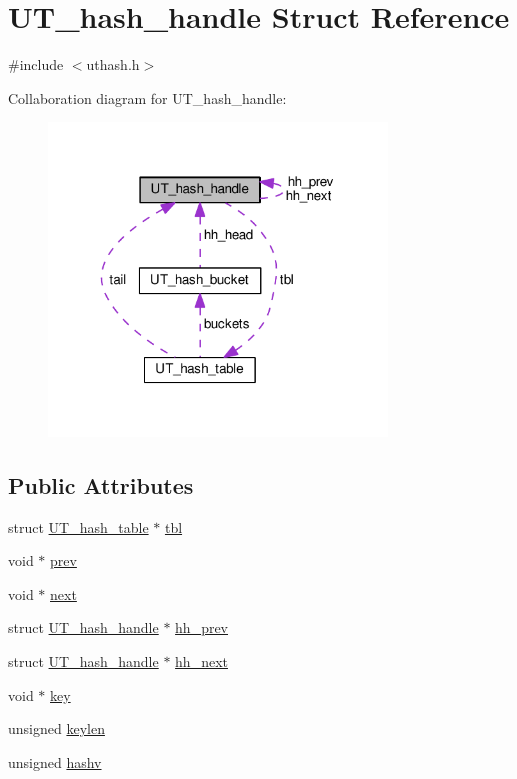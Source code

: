 \hypertarget{struct_u_t__hash__handle}{}\section{U\+T\+\_\+hash\+\_\+handle Struct Reference}
\label{struct_u_t__hash__handle}


{\ttfamily \#include $<$uthash.\+h$>$}



Collaboration diagram for U\+T\+\_\+hash\+\_\+handle\+:
\nopagebreak
\begin{figure}[H]
\begin{center}
\leavevmode
\includegraphics[width=255pt]{struct_u_t__hash__handle__coll__graph}
\end{center}
\end{figure}
\subsection*{Public Attributes}
\begin{DoxyCompactItemize}
\item 
struct \hyperlink{struct_u_t__hash__table}{U\+T\+\_\+hash\+\_\+table} $\ast$ \hyperlink{struct_u_t__hash__handle_ad2035ee3b2aa55b22e352341372a5e73}{tbl}
\item 
void $\ast$ \hyperlink{struct_u_t__hash__handle_abaf54a69367933df2d45575f48ca6a58}{prev}
\item 
void $\ast$ \hyperlink{struct_u_t__hash__handle_a93bc88ffe97f85ea0d9e0056b7118942}{next}
\item 
struct \hyperlink{struct_u_t__hash__handle}{U\+T\+\_\+hash\+\_\+handle} $\ast$ \hyperlink{struct_u_t__hash__handle_a3ec03e34d7975d5c1981c44b324619b2}{hh\+\_\+prev}
\item 
struct \hyperlink{struct_u_t__hash__handle}{U\+T\+\_\+hash\+\_\+handle} $\ast$ \hyperlink{struct_u_t__hash__handle_a4f6989385499ba6f594b0f0facd28325}{hh\+\_\+next}
\item 
void $\ast$ \hyperlink{struct_u_t__hash__handle_a40690fc15aeaeba8f25385f05f84dd4d}{key}
\item 
unsigned \hyperlink{struct_u_t__hash__handle_af2abdc405972a6bbdee2ade2c0f346c4}{keylen}
\item 
unsigned \hyperlink{struct_u_t__hash__handle_aae5e635fa110556e5007f627089f8323}{hashv}
\end{DoxyCompactItemize}


